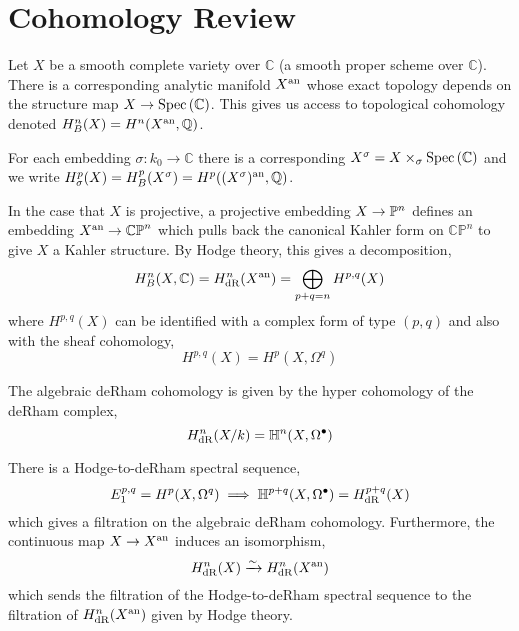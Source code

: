 \documentclass[12pt]{article}
\begin{document}
\section{Cohomology Review}

\newcommand{\CP}{\mathbb{CP}}
\renewcommand{\C}{\mathbb{C}}
\newcommand{\Hyper}{\mathbb{H}}


\begin{definition}
Let $X$ be a smooth complete variety over $\C$ (a smooth proper scheme over $\C$). There is a corresponding analytic manifold $X^{\an}$ whose exact topology depends on the structure map $X \to \Spec{\C}$. This gives us access to topological cohomology denoted $H_B^n(X) = H^{n}(X^\an, \Q)$. 
\end{definition}

\begin{definition}
For each embedding $\sigma : k_0 \to \C$ there is a corresponding $X^\sigma = X \times_\sigma \Spec{\C}$ and we write $H^p_\sigma(X) = H^p_B(X^\sigma) = H^p((X^\sigma)^\an, \Q)$. 
\end{definition}

\begin{remark}
In the case that $X$ is projective, a projective embedding $X \to \P^n$ defines an embedding $X^\an \to \CP^n$ which pulls back the canonical Kahler form on $\CP^n$ to give $X$ a Kahler structure. By Hodge theory, this gives a decomposition,
\[ H_B^n(X, \C) = H_{\dR}^n(X^\an) = \bigoplus_{p + q = n} H^{p,q}(X) \]
where $H^{p,q}(X)$ can be identified with a complex form of type $(p,q)$ and also with the sheaf cohomology,
\[ H^{p,q}(X) = H^p(X, \Omega^q) \]
\end{remark}

\begin{definition}
The algebraic deRham cohomology is given by the hyper cohomology of the deRham complex,
\[ H^n_\dR(X / k) = \Hyper^n(X, \Omega^\bullet) \]
\end{definition}

\begin{theorem}
There is a Hodge-to-deRham spectral sequence,
\[ E^{p,q}_1 = H^p(X, \Omega^q) \implies \Hyper^{p+q}(X, \Omega^\bullet) = H^{p + q}_{\dR}(X) \]
which gives a filtration on the algebraic deRham cohomology. Furthermore, the continuous map $X \to X^\an$ induces an isomorphism,
\[ H^n_\dR(X) \xrightarrow{\sim} H^n_{\dR}(X^\an) \]
which sends the filtration of the Hodge-to-deRham spectral sequence to the filtration of $H^n_{\dR}(X^\an)$ given by Hodge theory. 
\end{theorem}
\end{document}
